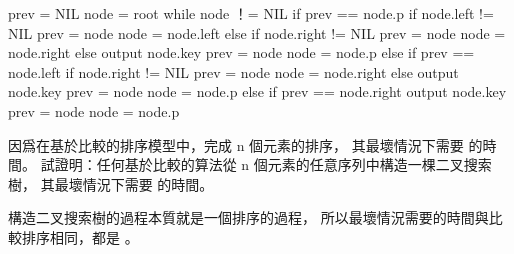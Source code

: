 \startCLRS
prev = NIL
node = root
while node ！= NIL
	if prev == node.p
		if node.left != NIL
			prev = node
			node = node.left
		else
			if node.right != NIL
				prev = node
				node = node.right
			else
				output node.key
				prev = node
				node = node.p
	else if prev == node.left
		if node.right != NIL
			prev = node
			node = node.right
		else
			output node.key
			prev = node
			node = node.p
	else if prev == node.right
		output node.key
		prev = node
		node = node.p
\stopCLRS
\stopANSWER

\startEXERCISE
因爲在基於比較的排序模型中，完成 n 個元素的排序，
其最壞情況下需要  的時間。
試證明：任何基於比較的算法從 n 個元素的任意序列中構造一棵二叉搜索樹，
其最壞情況下需要  的時間。
\stopEXERCISE

\startANSWER
構造二叉搜索樹的過程本質就是一個排序的過程，
所以最壞情況需要的時間與比較排序相同，都是 。
\stopANSWER

\stopsection
